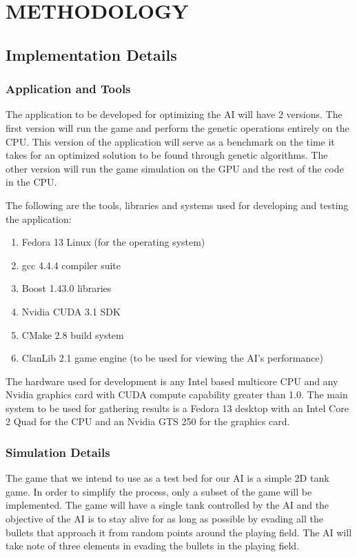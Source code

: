\chapter{METHODOLOGY}
%
%
\section{Implementation Details}

\subsection{Application and Tools}
The application to be developed for optimizing the AI will have 2 versions.
The first version will run the game and perform the genetic operations entirely
on the CPU. This version of the application will serve as a benchmark on the
time it takes for an optimized solution to be found through genetic algorithms.
The other version will run the game simulation on the GPU and the rest of the
code in the CPU.


The following are the tools, libraries and systems used for developing and testing
the application:

\begin{enumerate}
  \item Fedora 13 Linux (for the operating system)
  \item gcc 4.4.4 compiler suite
  \item Boost 1.43.0 libraries
  \item Nvidia CUDA 3.1 SDK
  \item CMake 2.8 build system
  \item ClanLib 2.1 game engine (to be used for viewing the AI's performance)
\end{enumerate}

The hardware used for development is any Intel based multicore CPU and any Nvidia
graphics card with CUDA compute capability greater than 1.0. The main system to be
used for gathering results is a Fedora 13 desktop with an Intel Core 2 Quad for the
CPU and an Nvidia GTS 250 for the graphics card.


\subsection{Simulation Details}
The game that we intend to use as a test bed for our AI is a simple 2D tank game.
In order to simplify the process, only a subset of the game will be implemented.
The game will have a single tank controlled by the AI and the objective of the AI
is to stay alive for as long as possible by evading all the bullets that approach
it from random points around the playing field. The AI will take note of three
elements in evading the bullets in the playing field.

